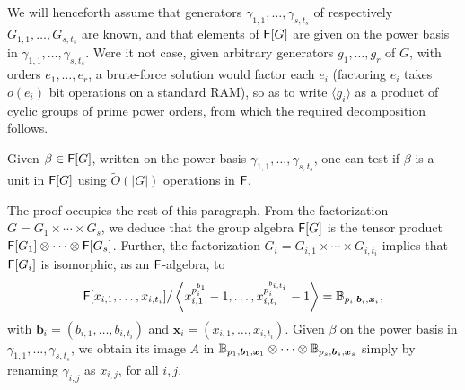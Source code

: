 We will henceforth assume that generators
$\gamma_{1,1},\dots,\gamma_{s,t_s}$ of respectively
$G_{1,1},\dots,G_{s,t_s}$ are known, and that elements of ${\mathsf{F}}[G]$ are
given on the power basis in $\gamma_{1,1},\dots,\gamma_{s,t_s}$. Were
it not case, given arbitrary generators $g_1,\dots,g_r$ of $G$, with
orders $e_1,\dots,e_r$, a brute-force solution would factor each $e_i$
(factoring $e_i$ takes $o(e_i)$ bit operations on a standard RAM), so
as to write $\langle g_i \rangle$ as a product of cyclic groups of
prime power orders, from which the required decomposition follows.

\begin{proposition}
  Given $\beta \in {\mathsf{F}}[G]$, written on the power basis
  $\gamma_{1,1},\dots,\gamma_{s,t_s}$, one can test if $\beta$ is a
  unit in ${\mathsf{F}}[G]$ using $\tilde{O}(|G|)$ operations in ${\mathsf{F}}$.
\end{proposition}
The proof occupies the rest of this paragraph.
From the factorization $G = G_1 \times \cdots \times G_s$, we deduce
that the group algebra ${\mathsf{F}}[G]$ is the tensor product ${\mathsf{F}}[G_1]
\otimes \cdots \otimes {\mathsf{F}}[G_s]$. Further, the 
factorization $G_i = G_{i,1} \times \cdots \times G_{i,t_i}$
implies that ${\mathsf{F}}[G_i]$ is isomorphic, as an ${\mathsf{F}}$-algebra, to
$${\mathsf{F}}[x_{i,1},\dots,x_{i,t_i}]/\left \langle
x_{i,1}^{p_i^{b_{1}}}-1,\dots,x_{i,t_i}^{p_i^{b_{i,t_i}}}-1\right\rangle
=\mathbb{B}_{p_i,\boldsymbol{b}_i,\boldsymbol{x}_i},$$ with $\boldsymbol{b}_i =
(b_{i,1},\dots,b_{i,t_i})$ and $\boldsymbol{x}_i =
(x_{i,1},\dots,x_{i,t_i})$. Given $\beta$ on the
power basis in $\gamma_{1,1},\dots,\gamma_{s,t_s}$, we obtain
its image 
$A$ in 
$\mathbb{B}_{p_1,\boldsymbol{b}_1,\boldsymbol{x}_1} \otimes \cdots \otimes 
\mathbb{B}_{p_s,\boldsymbol{b}_s,\boldsymbol{x}_s}$ simply 
by renaming $\gamma_{i,j}$ as $x_{i,j}$, for all $i,j$.


